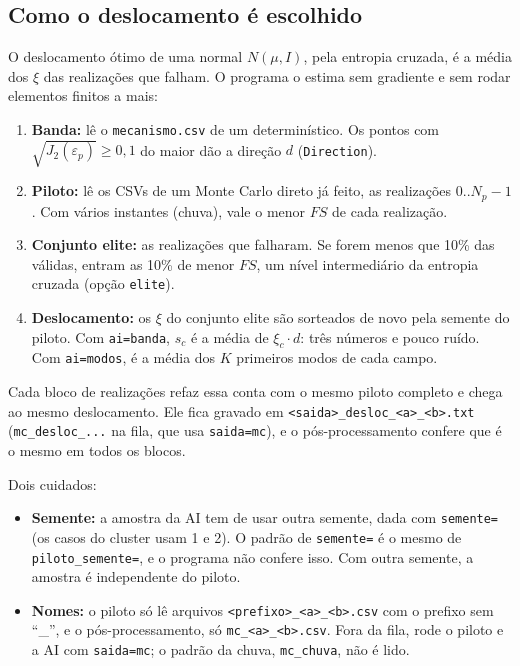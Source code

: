 \documentclass[11pt,a4paper]{article}
\begin{document}
\subsection{Como o deslocamento é escolhido}
O deslocamento ótimo de uma normal $N(\mu, I)$, pela entropia cruzada, é a média dos $\xi$ das realizações que falham.
O programa o estima sem gradiente e sem rodar elementos finitos a mais:
\begin{enumerate}
\item \textbf{Banda:} lê o \texttt{mecanismo.csv} de um determinístico. Os pontos com
$\sqrt{J_2(\varepsilon_p)} \geq 0{,}1$ do maior dão a direção $d$ (\texttt{Direction}).
\item \textbf{Piloto:} lê os CSVs de um Monte Carlo direto já feito, as realizações $0..N_p - 1$. Com vários instantes
(chuva), vale o menor $FS$ de cada realização.
\item \textbf{Conjunto elite:} as realizações que falharam. Se forem menos que 10\% das válidas, entram as 10\% de menor
$FS$, um nível intermediário da entropia cruzada (opção \texttt{elite}).
\item \textbf{Deslocamento:} os $\xi$ do conjunto elite são sorteados de novo pela semente do piloto. Com
\texttt{ai=banda}, $s_c$ é a média de $\xi_c \cdot d$: três números e pouco ruído. Com \texttt{ai=modos}, é a média dos
$K$ primeiros modos de cada campo.
\end{enumerate}
Cada bloco de realizações refaz essa conta com o mesmo piloto completo e chega ao mesmo deslocamento. Ele fica gravado em
\texttt{<saida>\_desloc\_<a>\_<b>.txt} (\texttt{mc\_desloc\_...} na fila, que usa \texttt{saida=mc}), e o pós-processamento
confere que é o mesmo em todos os blocos.

Dois cuidados:
\begin{itemize}
\item \textbf{Semente:} a amostra da AI tem de usar outra semente, dada com \texttt{semente=} (os casos do cluster usam
1 e 2). O padrão de \texttt{semente=} é o mesmo de \texttt{piloto\_semente=}, e o programa não confere isso. Com outra
semente, a amostra é independente do piloto.
\item \textbf{Nomes:} o piloto só lê arquivos \texttt{<prefixo>\_<a>\_<b>.csv} com o prefixo sem ``\_'', e o
pós-processamento, só \texttt{mc\_<a>\_<b>.csv}. Fora da fila, rode o piloto e a AI com \texttt{saida=mc}; o padrão da
chuva, \texttt{mc\_chuva}, não é lido.
\end{itemize}
\end{document}
